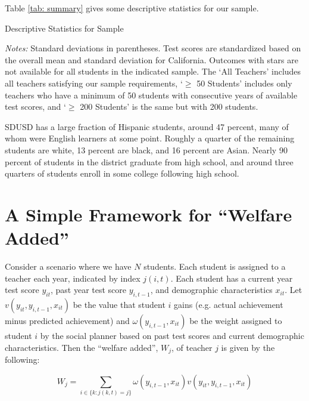 \documentclass[letterpaper,12pt]{article}
\begin{document}
Table \ref{tab: summary} gives some descriptive statistics for our sample.

\begin{table}[ht]
    \centering
    \caption{Descriptive Statistics for Sample}
    
    \label{tab: summary}
    \caption*{\scriptsize \textit{Notes:} Standard deviations in parentheses. Test scores are standardized based on the overall mean and standard deviation for California. Outcomes with stars are not available for all students in the indicated sample. The `All Teachers' includes all teachers satisfying our sample requirements, `$\geq$ 50 Students' includes only teachers who have a minimum of 50 students with consecutive years of available test scores, and `$\geq$ 200 Students' is the same but with 200 students.}
\end{table}

\noindent SDUSD has a large fraction of Hispanic students, around 47 percent, many of whom were English learners at some point. Roughly a quarter of the remaining students are white, 13 percent are black, and 16 percent are Asian. Nearly 90 percent of students in the district graduate from high school, and around three quarters of students enroll in some college following high school.




\section{A Simple Framework for ``Welfare Added''}\label{sec: Welfare}

Consider a scenario where we have $N$ students. Each student is assigned to a teacher each year, indicated by index $j(i,t)$. Each student has a current year test score $y_{it}$, past year test score $y_{i,t-1}$, and demographic characteristics $x_{it}$. Let $v(y_{it}, y_{i,t-1}, x_{it})$ be the value that student $i$ gains (e.g. actual achievement minus predicted achievement) and $\omega(y_{i,t-1}, x_{it})$ be the weight assigned to student $i$ by the social planner based on past test scores and current demographic characteristics. Then the ``welfare added'', $W_j$, of teacher $j$ is given by the following:

    \begin{equation}\label{eq: welfare}
        W_j = \sum_{i \in \{k : j(k, t) = j\} } \omega(y_{i,t-1}, x_{it})v(y_{it}, y_{i,t-1}, x_{it})
    \end{equation}
    
\end{document}
